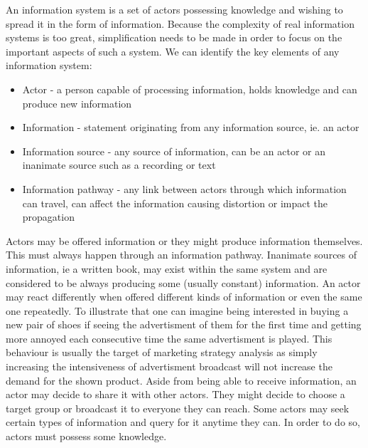 An information system is a set of actors possessing knowledge and wishing to spread it in the form of information.
Because the complexity of real information systems is too great, simplification needs to be made in order to focus on the important aspects of such a system.
We can identify the key elements of any information system:
\begin{itemize}
    \item Actor - a person capable of processing information, holds knowledge and can produce new information
    \item Information - statement originating from any information source, ie. an actor
    \item Information source - any source of information, can be an actor or an inanimate source such as a recording or text
    \item Information pathway - any link between actors through which information can travel, can affect the information causing distortion or impact the propagation
\end{itemize}
Actors may be offered information or they might produce information themselves.
This must always happen through an information pathway.
Inanimate sources of information, ie a written book, may exist within the same system and are considered to be always producing some (usually constant) information.
An actor may react differently when offered different kinds of information or even the same one repeatedly.
To illustrate that one can imagine being interested in buying a new pair of shoes if seeing the advertisment of them for the first time and getting more annoyed each consecutive time the same advertisment is played.
This behaviour is usually the target of marketing strategy analysis as simply increasing the intensiveness of advertisment broadcast will not increase the demand for the shown product.
Aside from being able to receive information, an actor may decide to share it with other actors.
They might decide to choose a target group or broadcast it to everyone they can reach.
Some actors may seek certain types of information and query for it anytime they can.
In order to do so, actors must possess some knowledge.

